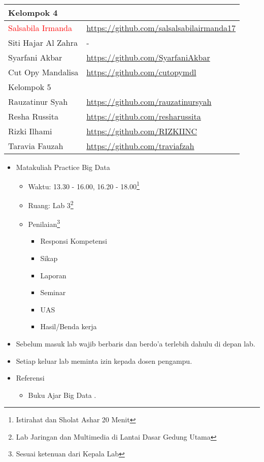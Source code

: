 \documentclass[a4paper]{tufte-handout}
\begin{document}
\begin{projects}
\begin{description}
\begin{table}[!ht]
\begin{tabular}{ll}
\midrule
Kelompok 4\\
\midrule
\textcolor{red}{Salsabila Irmanda}		& \url{https://github.com/salsalsabilairmanda17} \\
Siti Hajar Al Zahra		& - \\
Syarfani Akbar			& \url{https://github.com/SyarfaniAkbar} \\
Cut Opy Mandalisa		& \url{https://github.com/cutopymdl} \\
\midrule
Kelompok 5\\
\midrule
Rauzatinur Syah			& \url{https://github.com/rauzatinursyah} \\
Resha Russita			& \url{https://github.com/resharussita} \\
Rizki Ilhami			& \url{https://github.com/RIZKIINC} \\
Taravia Fauzah			& \url{https://github.com/traviafzah} \\
\midrule
\end{tabular}
\end{table}
	\end{description}
\end{projects}


\begin{maybe}
    \begin{itemize}
    	\item Matakuliah Practice Big Data
    	\begin{itemize}
    	\item Waktu: 13.30 - 16.00, 16.20 - 18.00\footnote{Istirahat dan Sholat Ashar 20 Menit}
    	\item Ruang: Lab 3\footnote{Lab Jaringan dan Multimedia di Lantai Dasar Gedung Utama}
    	\item Penilaian\footnote{Sesuai ketenuan dari Kepala Lab}
    	\begin{itemize}
    	\item Responsi Kompetensi
    	\item Sikap
    	\item Laporan
    	\item Seminar
    	\item UAS
    	\item Hasil/Benda kerja
    	\end{itemize}
    	\end{itemize}
    	\item Sebelum masuk lab wajib berbaris dan berdo'a terlebih dahulu di depan lab.
    	\item Setiap keluar lab meminta izin kepada dosen pengampu.
    	\item Referensi
    	\begin{itemize}
    		\item Buku Ajar Big Data \citep{Mursyidah2020}.
    	\end{itemize}
    \end{itemize}
\end{maybe}
\end{document}
